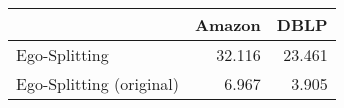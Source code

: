 \begin{tabular}{lrr}
\toprule
{} & Amazon &   DBLP \\
\midrule
Ego-Splitting            & 32.116 & 23.461 \\
Ego-Splitting (original) &  6.967 &  3.905 \\
\bottomrule
\end{tabular}
